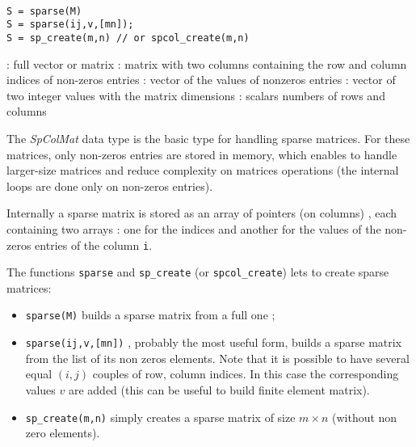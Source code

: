 
\begin{mandesc}
  \\
\end{mandesc}
\begin{calling_sequence}
\begin{verbatim}
S = sparse(M)
S = sparse(ij,v,[mn]);
S = sp_create(m,n) // or spcol_create(m,n)
\end{verbatim}

\end{calling_sequence}
\begin{parameters}
  \begin{varlist}
    :  full vector or matrix  
    : matrix with two columns containing the row and column indices of 
                non-zeros entries  
    : vector of the values of nonzeros entries
    : vector of two integer values with the matrix dimensions 
    : scalars numbers of rows and columns
  \end{varlist}
\end{parameters}

\begin{mandescription}

The \emph{SpColMat} data type is the basic type for handling sparse matrices. 
For these matrices, only non-zeros entries are stored in memory, which enables to 
handle larger-size matrices and reduce complexity on matrices operations (the internal
loops are done only on non-zeros entries).

Internally a sparse matrix is stored as an array of pointers (on columns) , each containing 
two arrays : one for the indices and another for the values of the non-zeros entries of
the column \verb+i+. 
 
The functions \verb+sparse+ and \verb+sp_create+ (or  \verb+spcol_create+) lets to create
sparse matrices:
\begin{itemize}
\item \verb+sparse(M)+ builds a sparse matrix from a full one ;
\item \verb+sparse(ij,v,[mn])+ , probably the most useful form, builds a sparse matrix
   from the list of its non zeros elements. Note that it is possible to have several equal
   $(i,j)$ couples of row, column indices. In this case the corresponding values $v$ are 
   added (this can be useful to build finite element matrix).
\item \verb+sp_create(m,n)+ simply creates a sparse matrix of size $m \times n$ (without
   non zero elements).   
\end{itemize}

\end{mandescription}

